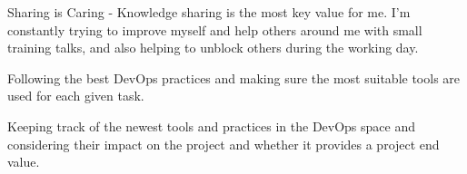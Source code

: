 \documentclass[9pt]{style/developercv}
\begin{document}
\begin{minipage}[t]{0.3\textwidth}
	\vspace{-\baselineskip}


  Sharing is Caring - Knowledge sharing is the most key value for me.
  I'm constantly trying to improve myself and help others around me with small training talks, and also helping to unblock others during the working day.

\end{minipage}
\hfill
\begin{minipage}[t]{0.3\textwidth}
	\vspace{-\baselineskip}

	Following the best DevOps practices and making sure the most suitable tools are used for each given task.

\end{minipage}
\hfill
\begin{minipage}[t]{0.3\textwidth}
	\vspace{-\baselineskip}

  Keeping track of the newest tools and practices in the DevOps space and considering their impact on the project and whether it provides a project end value.

\end{minipage}
\vspace{0.75cm}

\end{document}
